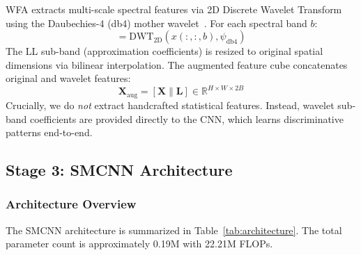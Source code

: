 \documentclass[conference]{IEEEtran}
\begin{document}
WFA extracts multi-scale spectral features via 2D Discrete Wavelet Transform using the Daubechies-4 (db4) mother wavelet~\cite{daubechies1992ten}. For each spectral band $b$:
\begin{equation}
[\text{LL}_b, (\text{LH}_b, \text{HL}_b, \text{HH}_b)] = \text{DWT}_{2\text{D}}(x(:,:,b), \psi_{\text{db4}})
\end{equation}
The LL sub-band (approximation coefficients) is resized to original spatial dimensions via bilinear interpolation. The augmented feature cube concatenates original and wavelet features:
\begin{equation}
\mathbf{X}_{\text{aug}} = [\mathbf{X} \| \mathbf{L}] \in \mathbb{R}^{H \times W \times 2B}
\end{equation}
Crucially, we do \textit{not} extract handcrafted statistical features. Instead, wavelet sub-band coefficients are provided directly to the CNN, which learns discriminative patterns end-to-end.

\subsection{Stage 3: SMCNN Architecture}

\subsubsection{Architecture Overview}

The SMCNN architecture is summarized in Table~\ref{tab:architecture}. The total parameter count is approximately 0.19M with 22.21M FLOPs.

\begin{table}[!t]
\caption{SMCNN Architecture Overview}
\label{tab:architecture}
\centering
{}
\end{table}
\end{document}

